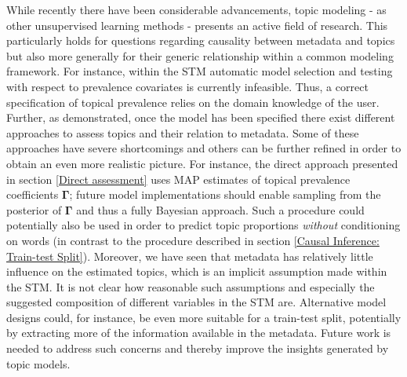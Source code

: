 While recently there have been considerable advancements, topic modeling - as other unsupervised learning methods - presents an active field of research. This particularly holds for questions regarding causality between metadata and topics but also more generally for their generic relationship within a common modeling framework. For instance, within the STM automatic model selection and testing with respect to prevalence covariates is currently infeasible. Thus, a correct specification of topical prevalence relies on the domain knowledge of the user. Further, as demonstrated, once the model has been specified there exist different approaches to assess topics and their relation to metadata. Some of these approaches have severe shortcomings and others can be further refined in order to obtain an even more realistic picture. For instance, the direct approach presented in section \ref{Direct assessment} uses MAP estimates of topical prevalence coefficients $\boldsymbol{\Gamma}$; future model implementations should enable sampling from the posterior of $\boldsymbol{\Gamma}$ and thus a fully Bayesian approach. Such a procedure could potentially also be used in order to predict topic proportions \textit{without} conditioning on words (in contrast to the procedure described in section \ref{Causal Inference: Train-test Split}). Moreover, we have seen that metadata has relatively little influence on the estimated topics, which is an implicit assumption made within the STM. It is not clear how reasonable such assumptions and especially the suggested composition of different variables in the STM are.
Alternative model designs could, for instance, be even more suitable for a train-test split, potentially by extracting more of the information available in the metadata. Future work is needed to address such concerns and thereby improve the insights generated by topic models.


